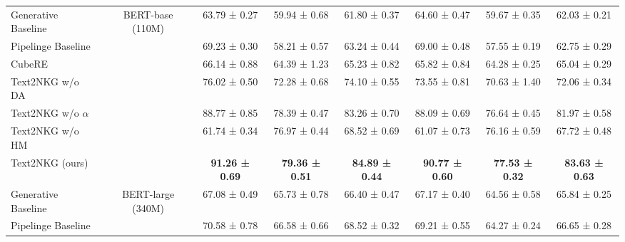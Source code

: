 \documentclass{article} \usepackage{iclr2024_conference,times}
\begin{document}
\begin{table*}[t]
{\begin{tabular}{lcccc|ccc}
Generative Baseline                                 & \multirow{7}{*}{BERT-base (110M)}                 & 63.79 ± 0.27          & 59.94 ± 0.68          & \multicolumn{1}{c|}{61.80 ± 0.37}          & 64.60 ± 0.47           & 59.67 ± 0.35          & 62.03 ± 0.21          \\
Pipelinge Baseline                                  &                                                   & 69.23 ± 0.30          & 58.21 ± 0.57          & \multicolumn{1}{c|}{63.24 ± 0.44}          & 69.00 ± 0.48           & 57.55 ± 0.19          & 62.75 ± 0.29          \\
CubeRE                                              &                                                   & 66.14 ± 0.88          & 64.39 ± 1.23          & \multicolumn{1}{c|}{65.23 ± 0.82}          & 65.82 ± 0.84           & 64.28 ± 0.25          & 65.04 ± 0.29          \\
Text2NKG w/o DA                                     &                                                   & 76.02 ± 0.50          & 72.28 ± 0.68          & \multicolumn{1}{c|}{74.10 ± 0.55}          & 73.55 ± 0.81           & 70.63 ± 1.40          & 72.06 ± 0.34          \\
Text2NKG w/o $\alpha$                               &                                                   & 88.77 ± 0.85          & 78.39 ± 0.47          & \multicolumn{1}{c|}{83.26 ± 0.70}          & 88.09 ± 0.69           & 76.64 ± 0.45          & 81.97 ± 0.58          \\
Text2NKG w/o HM                                     &                                                   & 61.74 ± 0.34          & 76.97 ± 0.44          & \multicolumn{1}{c|}{68.52 ± 0.69}          & 61.07 ± 0.73           & 76.16 ± 0.59          & 67.72 ± 0.48          \\
Text2NKG (ours)                                     &                                                   & \textbf{91.26 ± 0.69} & \textbf{79.36 ± 0.51} & \multicolumn{1}{c|}{\textbf{84.89 ± 0.44}} & \textbf{90.77 ± 0.60}  & \textbf{77.53 ± 0.32} & \textbf{83.63 ± 0.63} \\ \hline
Generative Baseline                                 & \multirow{4}{*}{BERT-large (340M)}                & 67.08 ± 0.49          & 65.73 ± 0.78          & \multicolumn{1}{c|}{66.40 ± 0.47}          & 67.17 ± 0.40           & 64.56 ± 0.58          & 65.84 ± 0.25          \\
Pipelinge Baseline                                  &                                                   & 70.58 ± 0.78          & 66.58 ± 0.66          & \multicolumn{1}{c|}{68.52 ± 0.32}          & 69.21 ± 0.55           & 64.27 ± 0.24          & 66.65 ± 0.28          \\

\end{tabular}}
\end{table*}
\end{document}
